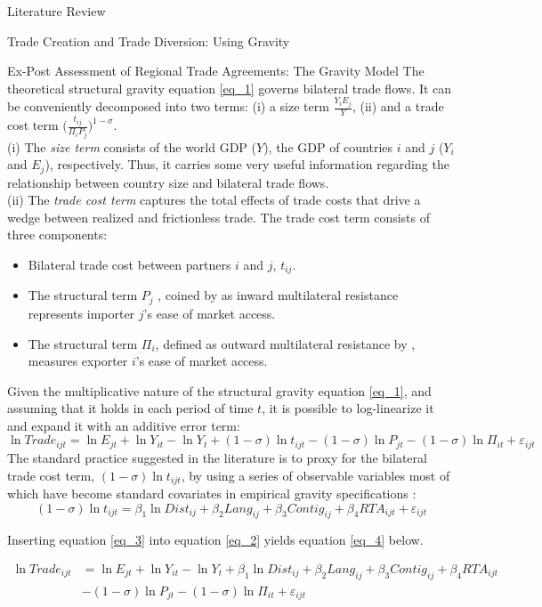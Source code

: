 \begin{section}{Literature Review}
\begin{subsection}{Trade Creation and Trade Diversion: Using Gravity}
\begin{subsubsection}{Ex-Post Assessment of Regional Trade Agreements: The Gravity Model}
The theoretical structural gravity equation \ref{eq_1} governs bilateral trade flows. It can be conveniently decomposed into two terms: (i) a size term $\frac{Y_{i}E_{j}}{Y}$, (ii) and a trade cost term $\Big(\frac{t_{ij}}{\Pi_{i}P_{j}}\Big)^{1-\sigma}$.
\bigskip
\\
(i) The \textit{size term} consists of the world GDP ($Y$), the GDP of countries $i$ and $j$ ($Y_{i}$ and $E_{j}$), respectively. Thus, it carries some very useful information regarding the relationship between country size and bilateral trade flows.
\bigskip
\\
(ii) The \textit{trade cost term} captures the total effects of trade costs that drive a wedge between realized and frictionless trade. The trade cost term consists of three components:
\begin{itemize}
\item Bilateral trade cost between partners $i$ and $j$, $t_{ij}$.
\item The structural term $P_{j}$ , coined by \cite{avw2003} as inward multilateral resistance represents importer $j$’s ease of market access.
\item The structural term $\Pi_{i}$, defined as outward multilateral resistance by \cite{avw2003}, measures exporter $i$’s ease of market access.
\end{itemize}

Given the multiplicative nature of the structural gravity equation \ref{eq_1}, and assuming that it holds in each period of time $t$, it is possible to log-linearize it and expand it with an additive error term:
\begin{equation}\label{eq_2}
   \ln{Trade_{ijt}}=\ln{E_{jt}}+ \ln{Y_{it}}-\ln{Y_{t}}+(1-\sigma)\ln{t_{ijt}}-(1-\sigma)\ln{P_{jt}}-(1-\sigma)\ln{\Pi_{it}}+\varepsilon_{ijt}
\end{equation}
The standard practice suggested in the literature is to proxy for the
bilateral trade cost term, $(1-\sigma)\ln{t_{ijt}}$, by using a series of observable variables most of which have become standard covariates in empirical gravity specifications \cite{ypl_2016}:
\begin{equation}\label{eq_3}
(1-\sigma)\ln{t_{ijt}}=\beta_{1}\ln{Dist_{ij}} + \beta_2 Lang_{ij} + \beta_3 Contig_{ij} + \beta_4RTA_{ijt}+\varepsilon_{ijt}
\end{equation}

Inserting equation \ref{eq_3} into equation \ref{eq_2} yields equation \ref{eq_4} below. 

\begin{equation}\label{eq_4}
\begin{aligned}
   \ln{Trade_{ijt}} &=\ln{E_{jt}}+ \ln{Y_{it}}-\ln{Y_{t}}+\beta_{1}\ln{Dist_{ij}} + \beta_2 Lang_{ij} + \beta_3 Contig_{ij} + \beta_4RTA_{ijt}\\
   &-(1-\sigma)\ln{P_{jt}}-(1-\sigma)\ln{\Pi_{it}}+\varepsilon_{ijt}
\end{aligned}
\end{equation}


\end{subsubsection}
\end{subsection}
\end{section}
